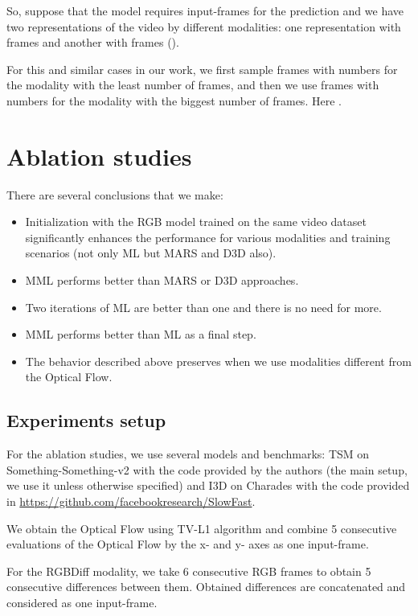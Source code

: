 \documentclass[conference]{IEEEtran}
\begin{document}
So, suppose that the model requires  input-frames for the prediction and we have two representations of the video by different modalities: one representation with  frames and another with  frames ().

For this and similar cases in our work, we first sample frames with numbers  for the modality with the least number of frames, and then we use frames with numbers  for the modality with the biggest number of frames. Here .

\section{Ablation studies} \label{sec:ablation}

There are several conclusions that we make:
\begin{itemize}
\item Initialization with the RGB model trained on the same video dataset significantly enhances the performance for various modalities and training scenarios (not only ML but MARS and D3D also).
\item MML performs better than MARS or D3D approaches.
\item Two iterations of ML are better than one and there is no need for more.
\item MML performs better than ML as a final step.
\item The behavior described above preserves when we use modalities different from the Optical Flow.
\end{itemize}

\subsection{Experiments setup}

For the ablation studies, we use several models and benchmarks: TSM \cite{shao2020temporal} on Something-Something-v2 \cite{goyal2017something} with the code provided by the authors (the main setup, we use it unless otherwise specified) and I3D \cite{carreira2017quo} on Charades \cite{Sigurdsson2016HollywoodIH} with the code provided in \url{https://github.com/facebookresearch/SlowFast}.

We obtain the Optical Flow using TV-L1 algorithm \cite{zach2007duality} and combine 5 consecutive evaluations of the Optical Flow by the x- and y- axes as one input-frame.

For the RGBDiff modality, we take 6 consecutive RGB frames to obtain 5 consecutive differences between them. Obtained differences are concatenated and considered as one input-frame.
\end{document}
